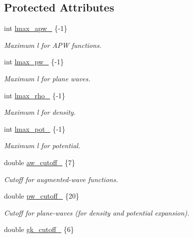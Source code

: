 \subsection*{Protected Attributes}
\begin{DoxyCompactItemize}
\item 
int \hyperlink{classsirius_1_1_simulation__parameters_aaca9e2dccbb92ac11b58ba2c16a2c301}{lmax\+\_\+apw\+\_\+} \{-\/1\}
\begin{DoxyCompactList}\small\item\em Maximum l for A\+P\+W functions. \end{DoxyCompactList}\item 
int \hyperlink{classsirius_1_1_simulation__parameters_a71731a796167ac080a67f1c072b2eec5}{lmax\+\_\+pw\+\_\+} \{-\/1\}
\begin{DoxyCompactList}\small\item\em Maximum l for plane waves. \end{DoxyCompactList}\item 
int \hyperlink{classsirius_1_1_simulation__parameters_a019c88d01c1274ab1b9be0aa9c7633b6}{lmax\+\_\+rho\+\_\+} \{-\/1\}
\begin{DoxyCompactList}\small\item\em Maximum l for density. \end{DoxyCompactList}\item 
int \hyperlink{classsirius_1_1_simulation__parameters_a2e7fb99fcc65e7d37d9cc540136faa9c}{lmax\+\_\+pot\+\_\+} \{-\/1\}
\begin{DoxyCompactList}\small\item\em Maximum l for potential. \end{DoxyCompactList}\item 
double \hyperlink{classsirius_1_1_simulation__parameters_a55eab5c9318a8071c20ee21284beaa32}{aw\+\_\+cutoff\+\_\+} \{7\}
\begin{DoxyCompactList}\small\item\em Cutoff for augmented-\/wave functions. \end{DoxyCompactList}\item 
double \hyperlink{classsirius_1_1_simulation__parameters_a4f720f85686b486b29992c508ff94491}{pw\+\_\+cutoff\+\_\+} \{20\}
\begin{DoxyCompactList}\small\item\em Cutoff for plane-\/waves (for density and potential expansion). \end{DoxyCompactList}\item 
double \hyperlink{classsirius_1_1_simulation__parameters_a219a43b81780aa1c53b037b748970de8}{gk\+\_\+cutoff\+\_\+} \{6\}

\end{DoxyCompactItemize}
